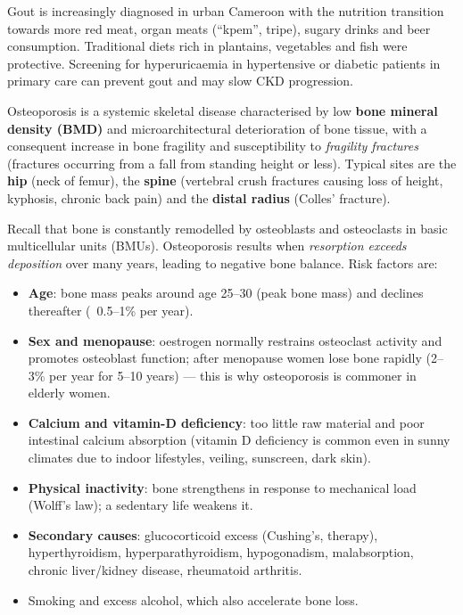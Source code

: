 \documentclass[11pt]{article}
\newcommand{\cle}[1]{{\popxbold\color{popdark}#1}}
\newcounter{popsec}
\newcounter{popsub}
\newcommand{\courssub}[1]{%
  \stepcounter{popsub}%
  \par\vspace{9pt}\noindent{\popxbold\fontsize{11.5}{13}\selectfont\color{popink}{\color{poporange}\thepopsec.\thepopsub}\hspace{6pt}#1}\par\nopagebreak\vspace{4pt}
}
\begin{document}
\begin{savaistu}
Gout is increasingly diagnosed in urban Cameroon with the nutrition transition towards more red meat, organ meats (``kpem'', tripe), sugary drinks and beer consumption. Traditional diets rich in plantains, vegetables and fish were protective. Screening for hyperuricaemia in hypertensive or diabetic patients in primary care can prevent gout and may slow CKD progression.
\end{savaistu}

\courssub{Osteoporosis: the silent thinning of bone}

\begin{definition}[Osteoporosis]
\cle{Osteoporosis} is a systemic skeletal disease characterised by low \textbf{bone mineral density (BMD)} and microarchitectural deterioration of bone tissue, with a consequent increase in bone fragility and susceptibility to \emph{fragility fractures} (fractures occurring from a fall from standing height or less). Typical sites are the \textbf{hip} (neck of femur), the \textbf{spine} (vertebral crush fractures causing loss of height, kyphosis, chronic back pain) and the \textbf{distal radius} (Colles' fracture).
\end{definition}

Recall that bone is constantly remodelled by osteoblasts and osteoclasts in basic multicellular units (BMUs). Osteoporosis results when \emph{resorption exceeds deposition} over many years, leading to negative bone balance. Risk factors are:

\begin{itemize}
\item \textbf{Age}: bone mass peaks around age 25--30 (peak bone mass) and declines thereafter (~0.5--1\% per year).
\item \textbf{Sex and menopause}: oestrogen normally restrains osteoclast activity and promotes osteoblast function; after menopause women lose bone rapidly (2--3\% per year for 5--10 years) — this is why osteoporosis is commoner in elderly women.
\item \textbf{Calcium and vitamin-D deficiency}: too little raw material and poor intestinal calcium absorption (vitamin D deficiency is common even in sunny climates due to indoor lifestyles, veiling, sunscreen, dark skin).
\item \textbf{Physical inactivity}: bone strengthens in response to mechanical load (Wolff's law); a sedentary life weakens it.
\item \textbf{Secondary causes}: glucocorticoid excess (Cushing's, therapy), hyperthyroidism, hyperparathyroidism, hypogonadism, malabsorption, chronic liver/kidney disease, rheumatoid arthritis.
\item Smoking and excess alcohol, which also accelerate bone loss.
\end{itemize}
\end{document}
